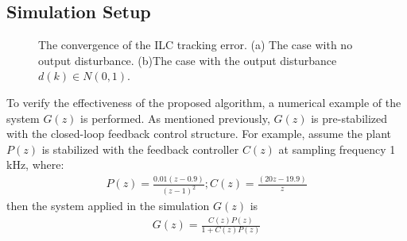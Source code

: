 \documentclass[a4paper, 12pt, twoside, openright]{mythesis}
\begin{document}
\subsection{Simulation Setup} 
\label{sec: Simulation Setup}

\begin{figure}[t]
 	\begin{center}
 	\caption{The convergence of the ILC tracking error. (a) The case with no output disturbance. (b)The case with the output disturbance $d(k)\in \mathit{N}(0,1)$.}
 	\label{fig:ErrConvg}
 	\end{center}
\end{figure}


To verify the effectiveness of the proposed algorithm, a numerical example of the system $G(z)$ is performed. As mentioned previously, $G(z)$ is pre-stabilized with the closed-loop feedback control structure. For example, assume the plant $P(z)$ is stabilized with the feedback controller $C(z)$ at sampling frequency 1 kHz, where:
\begin{align}
P(z)=\frac{0.01(z-0.9)}{(z-1)^2}; C(z)=\frac{(20z-19.9)}{z}
\end{align}  
then the system applied in the simulation $G(z)$ is
\begin{align}
G(z)=\frac{C(z)P(z)}{1+C(z)P(z)}
\end{align}
\end{document}
